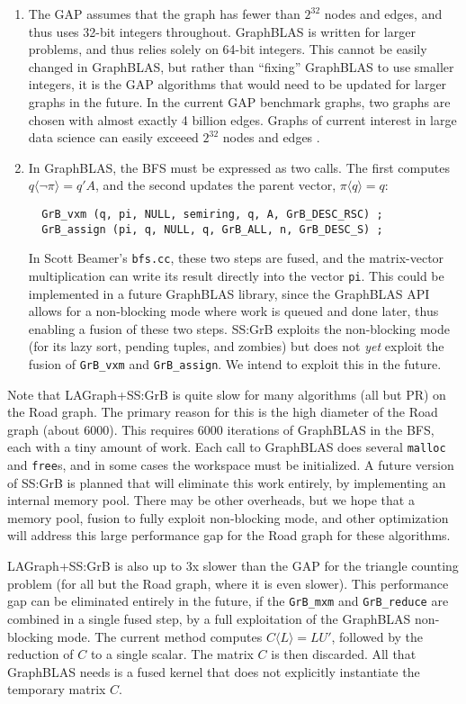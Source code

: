 \begin{enumerate}
\item
The GAP assumes that the graph has fewer than $2^{32}$ nodes and edges, and
thus uses 32-bit integers throughout.  GraphBLAS is written for larger
problems, and thus relies solely on 64-bit integers.  This cannot be easily
changed in GraphBLAS, but rather than ``fixing'' GraphBLAS to use smaller
integers, it is the GAP algorithms that would need to be updated for larger
graphs in the future.  In the current GAP benchmark graphs, two graphs are
chosen with almost exactly 4 billion edges.  Graphs of current interest in
large data science can easily exceeed $2^{32}$ nodes and edges \cite{9286235}.

\item In GraphBLAS, the BFS must be expressed as two calls.  The first computes
$q \langle \neg \pi \rangle = q'A$, and the second updates the parent vector,
$ \pi \langle q \rangle = q$:

{\footnotesize
\begin{verbatim}
  GrB_vxm (q, pi, NULL, semiring, q, A, GrB_DESC_RSC) ;
  GrB_assign (pi, q, NULL, q, GrB_ALL, n, GrB_DESC_S) ; \end{verbatim}}

In Scott Beamer's \verb'bfs.cc', these two steps are fused, and the
matrix-vector multiplication can write its result directly into the vector
\verb'pi'.  This could be implemented in a future GraphBLAS library, since the
GraphBLAS API allows for a non-blocking mode where work is queued and done
later, thus enabling a fusion of these two steps.  SS:GrB exploits the
non-blocking mode (for its lazy sort, pending tuples, and zombies) but does not
{\em yet} exploit the fusion of \verb'GrB_vxm' and \verb'GrB_assign'.  We
intend to exploit this in the future.
\end{enumerate}

Note that LAGraph+SS:GrB is quite slow for many algorithms (all but PR) on the
Road graph.  The primary reason for this is the high diameter of the Road graph
(about 6000).  This requires 6000 iterations of GraphBLAS in the BFS, each with
a tiny amount of work.  Each call to GraphBLAS does several \verb'malloc' and
\verb'free's, and in some cases the workspace must be initialized.  A future
version of SS:GrB is planned that will eliminate this work entirely, by
implementing an internal memory pool.  There may be other overheads, but we
hope that a memory pool, fusion to fully exploit non-blocking mode, and other
optimization will address this large performance gap for the Road graph for
these algorithms.

LAGraph+SS:GrB is also up to 3x slower than the GAP for the triangle counting
problem (for all but the Road graph, where it is even slower).  This
performance gap can be eliminated entirely in the future, if the \verb'GrB_mxm'
and \verb'GrB_reduce' are combined in a single fused step, by a full
exploitation of the GraphBLAS non-blocking mode.  The current method computes
$C \langle L \rangle = LU'$, followed by the reduction of $C$ to a single
scalar.  The matrix $C$ is then discarded.  All that GraphBLAS needs is a fused
kernel that does not explicitly instantiate the temporary matrix $C$.

